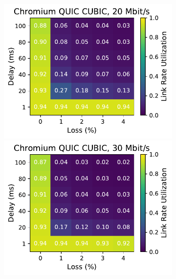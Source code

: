 \begin{figure}[ht]
\begin{subfigure}[b]{0.22\linewidth}
        \includegraphics[width=\linewidth,trim={0 0 2cm 0},clip]{splitting/figures/heatmaps/heatmap_quic_cubic_20mbps.pdf}
        \includegraphics[width=\linewidth,trim={0 0 2cm 0},clip]{splitting/figures/heatmaps/heatmap_quic_cubic_30mbps.pdf}

\end{subfigure}
\end{figure}
